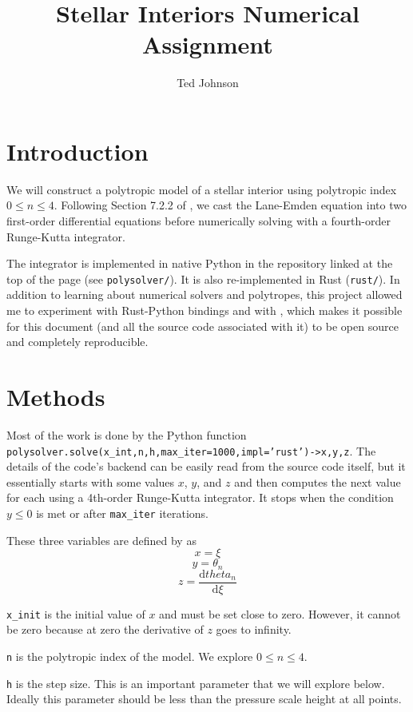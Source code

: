 \documentclass[twocolumn]{aastex631}
\begin{document}
\title{Stellar Interiors Numerical Assignment}

\author{Ted Johnson}


\section{Introduction}
\label{sec:intro}

We will construct a polytropic model of a stellar interior using
polytropic index $0\le n \le 4$. Following Section 7.2.2 of
\citet{textbook}, we cast the Lane-Emden equation into two
first-order differential equations before numerically solving
with a fourth-order Runge-Kutta integrator.

The integrator is implemented in native Python in the repository
linked at the top of the page (see \texttt{polysolver/}). It is
also re-implemented in Rust (\texttt{rust/}). In addition to
learning about numerical solvers and polytropes, this project
allowed me to experiment with Rust-Python bindings and with
\showyourwork, which makes it possible for this document (and
all the source code associated with it) to be open source and completely
reproducible.


\section{Methods}
\label{sec:methods}
Most of the work is done by the Python function
\texttt{polysolver.solve(x_int,n,h,max_iter=1000,impl='rust')->x,y,z}.
The details of the code's backend can be easily read from
the source code itself, but it essentially starts with some
values $x$, $y$, and $z$ and then computes the next value for
each using a 4th-order Runge-Kutta integrator. It stops when
the condition $y\le 0$ is met or after \texttt{max_iter} iterations.

These three variables are defined by \citet{textbook} as
\[ x = \xi\]
\[y = \theta_n\]
\[z = \frac{\text{d}theta_n}{\text{d}\xi}\]

\texttt{x_init} is the initial value of $x$ and must be set close to zero.
However, it cannot be zero because at zero the derivative of $z$ goes to infinity.

\texttt{n} is the polytropic index of the model. We explore
$0\le n \le 4$.

\texttt{h} is the step size. This is an important parameter that we will
explore below. Ideally this parameter should be less than
the pressure scale height at all points.
\end{document}
